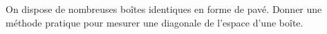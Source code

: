On dispose de nombreuses boîtes identiques en forme de pavé. Donner une méthode pratique pour mesurer une diagonale de l'espace d'une boîte.
